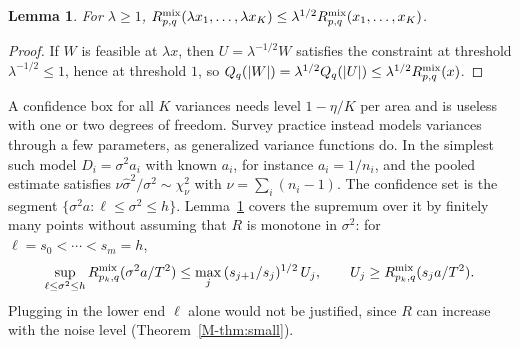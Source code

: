 \documentclass[11pt]{article}
\newtheorem{lemma}{Lemma}
\begin{document}
\begin{lemma}\label{lem:scale}
For $\lambda \ge 1$, $R^{\rm mix}_{p,q}(\lambda x_1, \ldots, \lambda x_K) \le \lambda^{1/2} R^{\rm mix}_{p,q}(x_1, \ldots, x_K)$.
\end{lemma}

\begin{proof}
If $W$ is feasible at $\lambda x$, then $U = \lambda^{-1/2}W$ satisfies the constraint at threshold $\lambda^{-1/2} \le 1$, hence at threshold $1$, so $Q_q(|W|) = \lambda^{1/2}Q_q(|U|) \le \lambda^{1/2}R^{\rm mix}_{p,q}(x)$.
\end{proof}

A confidence box for all $K$ variances needs level $1 - \eta/K$ per area and is useless with one or two degrees of freedom. Survey practice instead models variances through a few parameters, as generalized variance functions do. In the simplest such model $D_i = \sigma^2 a_i$ with known $a_i$, for instance $a_i = 1/n_i$, and the pooled estimate satisfies $\nu\hat\sigma^2/\sigma^2 \sim \chi^2_\nu$ with $\nu = \sum_i(n_i - 1)$. The confidence set is the segment $\{\sigma^2 a : \ell \le \sigma^2 \le h\}$. Lemma~\ref{lem:scale} covers the supremum over it by finitely many points without assuming that $R$ is monotone in $\sigma^2$: for $\ell = s_0 < \cdots < s_m = h$,
\[
\sup_{\ell \le \sigma^2 \le h} R^{\rm mix}_{p_k,q}(\sigma^2 a/T^2) \le \max_j\,(s_{j+1}/s_j)^{1/2}\,U_j, \qquad U_j \ge R^{\rm mix}_{p_k,q}(s_j a/T^2).
\]
Plugging in the lower end $\ell$ alone would not be justified, since $R$ can increase with the noise level (Theorem~\ref{M-thm:small}).
\end{document}
